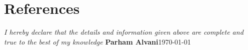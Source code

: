 \documentclass[11pt, a4paper, color, final]{moderncv}
\begin{document}






\section{References}
\begin{cvcolumns}
\end{cvcolumns}

\emptysection{}\closesection{}
\vfill
\textit{I hereby declare that the details and information given above are complete and true to the best of my knowledge}
\linebreak
\textbf{Parham Alvani}\hfil\today
\end{document}
